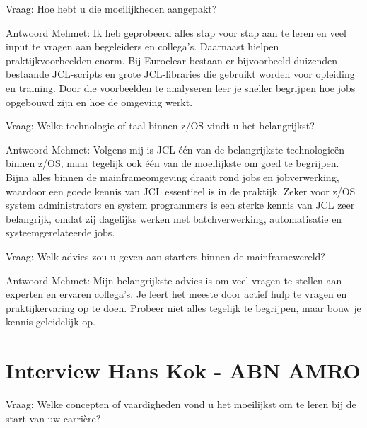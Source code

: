 Vraag: Hoe hebt u die moeilijkheden aangepakt?

Antwoord Mehmet: Ik heb geprobeerd alles stap voor stap aan te leren en veel input te vragen aan begeleiders en collega’s. Daarnaast hielpen praktijkvoorbeelden enorm. Bij Euroclear bestaan er bijvoorbeeld duizenden bestaande JCL-scripts en grote JCL-libraries die gebruikt worden voor opleiding en training. Door die voorbeelden te analyseren leer je sneller begrijpen hoe jobs opgebouwd zijn en hoe de omgeving werkt.

Vraag: Welke technologie of taal binnen z/OS vindt u het belangrijkst?

Antwoord Mehmet: Volgens mij is JCL één van de belangrijkste technologieën binnen z/OS, maar tegelijk ook één van de moeilijkste om goed te begrijpen. Bijna alles binnen de mainframeomgeving draait rond jobs en jobverwerking, waardoor een goede kennis van JCL essentieel is in de praktijk. Zeker voor z/OS system administrators en system programmers is een sterke kennis van JCL zeer belangrijk, omdat zij dagelijks werken met batchverwerking, automatisatie en systeemgerelateerde jobs.

Vraag: Welk advies zou u geven aan starters binnen de mainframewereld?

Antwoord Mehmet: Mijn belangrijkste advies is om veel vragen te stellen aan experten en ervaren collega’s. Je leert het meeste door actief hulp te vragen en praktijkervaring op te doen. Probeer niet alles tegelijk te begrijpen, maar bouw je kennis geleidelijk op.

\section{Interview Hans Kok - ABN AMRO}
Vraag: Welke concepten of vaardigheden vond u het moeilijkst om te leren
bij de start van uw carrière?

